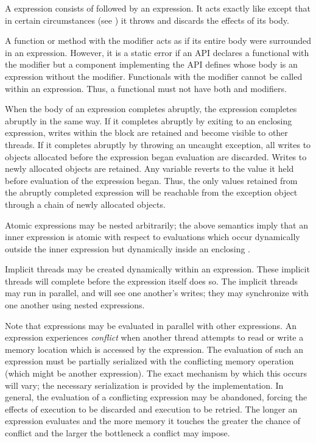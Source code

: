 A  expression consists of  followed by
an expression.  It acts exactly like  except that in
certain circumstances (see ) it throws
 and discards the effects of its body.

A function or method with the modifier  acts as if its entire
body were surrounded in an  expression.
However, it is a static error if an API declares a functional 
with the modifier  but a component implementing the API
defines  whose body is an  expression without the
modifier.  Functionals with the modifier  cannot be called
within an  expression.  Thus, a
functional must not have both  and  modifiers.

When the body of an  expression completes abruptly, the
 expression completes abruptly in the same way.  If it
completes abruptly by exiting to an enclosing  expression,
writes within the block are retained and become visible to other
threads.  If it completes abruptly by throwing an uncaught exception,
all writes to objects allocated before the 
expression began evaluation are discarded.  Writes to newly
allocated objects are retained.  Any variable reverts to the value it
held before evaluation of the  expression began.  Thus, the
only values retained from the abruptly completed  expression
will be reachable from the exception object through a chain of newly
allocated objects.

Atomic expressions may be nested arbitrarily; the above semantics
imply that an inner  expression is atomic with respect to
evaluations which occur dynamically outside the inner 
expression but dynamically inside an enclosing .

Implicit threads may be created dynamically within an 
expression.  These implicit threads will complete before the
 expression itself does so.  The implicit threads may
run in parallel, and will see one another's writes; they may
synchronize with one another using nested  expressions.

Note that  expressions may be evaluated in parallel with
other expressions.  An  expression experiences
\emph{conflict} when another thread attempts to read or write a memory
location which is accessed by the  expression.  The
evaluation of such an expression must be partially serialized with the
conflicting memory operation (which might be another 
expression).  The exact mechanism by which this occurs will vary; the
necessary serialization is provided by the implementation.  In
general, the evaluation of a conflicting  expression may
be abandoned, forcing the effects of execution to be discarded and
execution to be retried.  The longer an  expression
evaluates and the more memory it touches the greater the chance of
conflict and the larger the bottleneck a conflict may impose.

